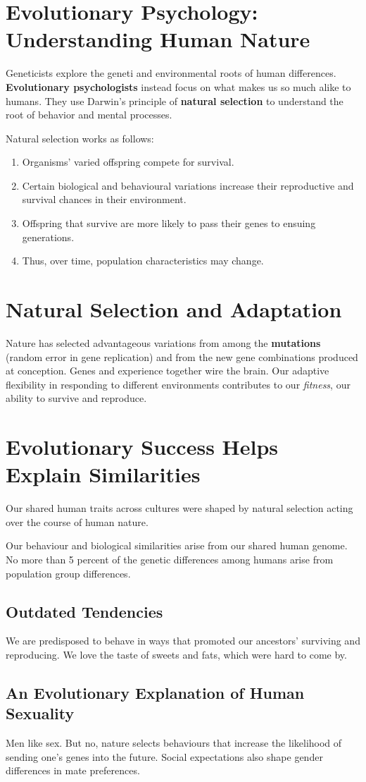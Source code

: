 \section*{Evolutionary Psychology: Understanding Human Nature}
Geneticists explore the geneti and environmental roots of human differences. \textbf{Evolutionary psychologists} instead focus on what makes us so much alike to humans. They use Darwin's principle of \textbf{natural selection} to understand the root of behavior and mental processes.

Natural selection works as follows:

\begin{enumerate}
\item Organisms' varied offspring compete for survival.
\item Certain biological and behavioural variations increase their reproductive and survival chances in their environment. 
\item Offspring that survive are more likely to pass their genes to ensuing generations.
\item Thus, over time, population characteristics may change.
\end{enumerate}

\section*{Natural Selection and Adaptation}

Nature has selected advantageous variations from among the \textbf{mutations} (random error in gene replication) and from the new gene combinations produced at conception. Genes and experience together wire the brain. Our adaptive flexibility in responding to different environments contributes to our \textit{fitness}, our ability to survive and reproduce.

\section*{Evolutionary Success Helps Explain Similarities}
Our shared human traits across cultures were shaped by natural selection acting over the course of human nature.

Our behaviour and biological similarities arise from our shared human genome. No more than 5 percent of the genetic differences among humans arise from population group differences. 

\subsection*{Outdated Tendencies}
We are predisposed to behave in ways that promoted our ancestors' surviving and reproducing. We love the taste of sweets and fats, which were hard to come by. 

\subsection*{An Evolutionary Explanation of Human Sexuality}
Men like sex. But no, nature selects behaviours that increase the likelihood of sending one's genes into the future. Social expectations also shape gender differences in mate preferences.











